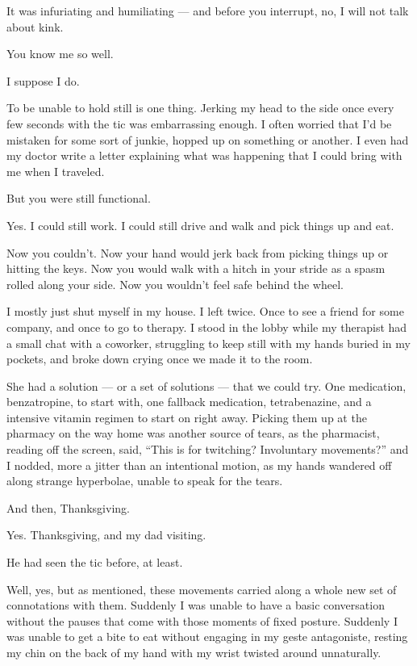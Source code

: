 \begin{paracol}{2}
\begin{leftcolumn}
It was infuriating and humiliating --- and before you interrupt, no, I will not talk about kink.

\begin{ally}
You know me so well.
\end{ally}
I suppose I do.

To be unable to hold still is one thing. Jerking my head to the side once every few seconds with the tic was embarrassing enough. I often worried that I'd be mistaken for some sort of junkie, hopped up on something or another. I even had my doctor write a letter explaining what was happening that I could bring with me when I traveled.

\begin{ally}
But you were still functional.
\end{ally}
Yes. I could still work. I could still drive and walk and pick things up and eat.

\begin{ally}
Now you couldn't. Now your hand would jerk back from picking things up or hitting the keys. Now you would walk with a hitch in your stride as a spasm rolled along your side. Now you wouldn't feel safe behind the wheel.
\end{ally}
I mostly just shut myself in my house. I left twice. Once to see a friend for some company, and once to go to therapy. I stood in the lobby while my therapist had a small chat with a coworker, struggling to keep still with my hands buried in my pockets, and broke down crying once we made it to the room.

She had a solution --- or a set of solutions --- that we could try. One medication, benzatropine, to start with, one fallback medication, tetrabenazine, and a intensive vitamin regimen to start on right away. Picking them up at the pharmacy on the way home was another source of tears, as the pharmacist, reading off the screen, said, ``This is for twitching? Involuntary movements?'' and I nodded, more a jitter than an intentional motion, as my hands wandered off along strange hyperbolae, unable to speak for the tears.

\begin{ally}
And then, Thanksgiving.
\end{ally}
Yes. Thanksgiving, and my dad visiting.

\begin{ally}
He had seen the tic before, at least.
\end{ally}
Well, yes, but as mentioned, these movements carried along a whole new set of connotations with them. Suddenly I was unable to have a basic conversation without the pauses that come with those moments of fixed posture. Suddenly I was unable to get a bite to eat without engaging in my geste antagoniste, resting my chin on the back of my hand with my wrist twisted around unnaturally.


\end{leftcolumn}
\end{paracol}
